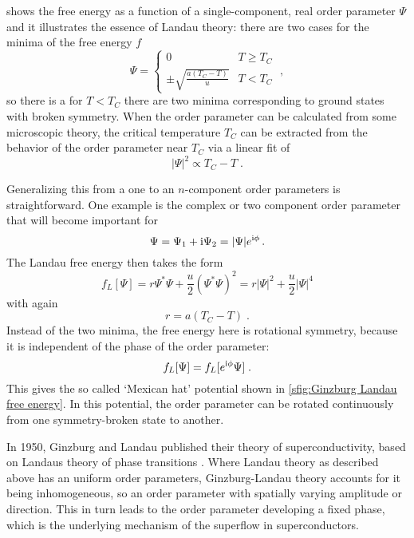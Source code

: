\documentclass[../notes.tex]{subfiles}
\begin{document}
 shows the free energy as a function of a single-component, real order parameter \(\Psi\) and it illustrates the essence of Landau theory: there are two cases for the minima of the free energy \(f\)
\begin{equation}
	\Psi = \begin{cases}
		0 & T \geq T_C \\
		\pm \sqrt{\frac{a (T_C - T)}{u}} & T < T_C
	\end{cases} \;,
\end{equation}
so there is a for \(T < T_C\) there are two minima corresponding to ground states with broken symmetry.
When the order parameter can be calculated from some microscopic theory, the critical temperature \(T_C\) can be extracted from the behavior of the order parameter near \(T_C\) via a linear fit of
\begin{equation}
	\vert \Psi \vert^2 \propto T_C - T \;.
\end{equation}

Generalizing this from a one to an \(n\)-component order parameters is straightforward.
One example is the complex or two component order parameter that will become important for 
\begin{equation}
	\Psi = \Psi_1 + \mathrm{i} \Psi_2 = \vert \Psi \vert e^{\mathrm{i} \phi} \,.
\end{equation}
The Landau free energy then takes the form
\begin{equation}
	f_L [\Psi] = r \Psi^* \Psi + \frac{u}{2} (\Psi^* \Psi)^2 = r \vert \Psi \vert^2 + \frac{u}{2} \vert \Psi \vert^4
\end{equation}
with again
\begin{equation}
	r = a(T_C - T) \;.
\end{equation}
Instead of the two minima, the free energy here is rotational symmetry, because it is independent of the phase of the order parameter: 
\begin{equation}
	f_L [\Psi] = f_L [e^{\mathrm{i} \phi} \Psi] \;.
\end{equation}
This gives the so called `Mexican hat' potential shown in \cref{sfig:Ginzburg Landau free energy}.
In this potential, the order parameter can be rotated continuously from one symmetry-broken state to another.

In 1950, Ginzburg and Landau published their theory of superconductivity, based on Landaus theory of phase transitions \cite{ginzburgTheorySuperconductivity1950}.
Where Landau theory as described above has an uniform order parameters, Ginzburg-Landau theory accounts for it being inhomogeneous, so an order parameter with spatially varying amplitude or direction.
This in turn leads to the order parameter developing a fixed phase, which is the underlying mechanism of the superflow in superconductors.
\end{document}
